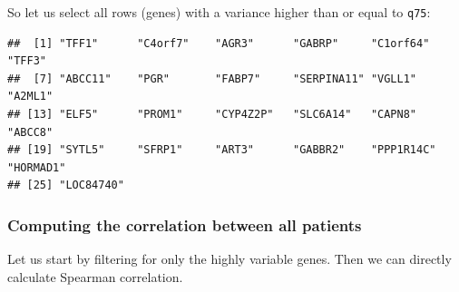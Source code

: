 \documentclass[
]{book}
\newenvironment{Shaded}{\begin{snugshade}}{\end{snugshade}}
\newcommand{\AttributeTok}[1]{\textcolor[rgb]{0.13,0.29,0.53}{#1}}
\newcommand{\CommentTok}[1]{\textcolor[rgb]{0.56,0.35,0.01}{\textit{#1}}}
\newcommand{\DocumentationTok}[1]{\textcolor[rgb]{0.56,0.35,0.01}{\textbf{\textit{#1}}}}
\newcommand{\FunctionTok}[1]{\textcolor[rgb]{0.13,0.29,0.53}{\textbf{#1}}}
\newcommand{\NormalTok}[1]{#1}
\newcommand{\OtherTok}[1]{\textcolor[rgb]{0.56,0.35,0.01}{#1}}
\newcommand{\SpecialCharTok}[1]{\textcolor[rgb]{0.81,0.36,0.00}{\textbf{#1}}}
\newcommand{\StringTok}[1]{\textcolor[rgb]{0.31,0.60,0.02}{#1}}
\begin{document}
So let us select all rows (genes) with a variance higher than or equal to \texttt{q75}:

\begin{Shaded}
\end{Shaded}

\begin{verbatim}
##  [1] "TFF1"      "C4orf7"    "AGR3"      "GABRP"     "C1orf64"   "TFF3"     
##  [7] "ABCC11"    "PGR"       "FABP7"     "SERPINA11" "VGLL1"     "A2ML1"    
## [13] "ELF5"      "PROM1"     "CYP4Z2P"   "SLC6A14"   "CAPN8"     "ABCC8"    
## [19] "SYTL5"     "SFRP1"     "ART3"      "GABBR2"    "PPP1R14C"  "HORMAD1"  
## [25] "LOC84740"
\end{verbatim}

\hypertarget{computing-the-correlation-between-all-patients}{%
\subsubsection{Computing the correlation between all patients}\label{computing-the-correlation-between-all-patients}}

Let us start by filtering for only the highly variable genes. Then we can directly calculate Spearman correlation.

\begin{Shaded}
\end{Shaded}
\end{document}
